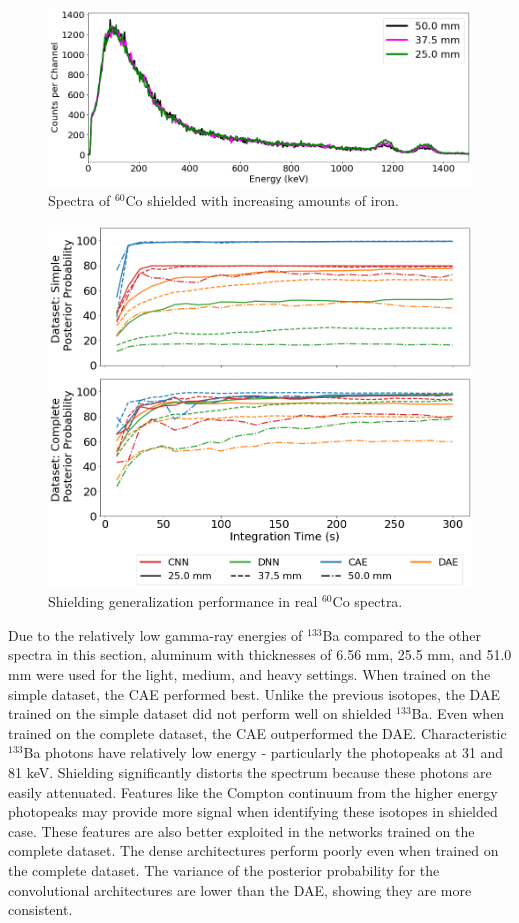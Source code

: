 \begin{figure}[H]
	\centering
	\includegraphics[width=1.0\linewidth]{images/shielded_co60}	\caption{Spectra of $^{60}$Co shielded with increasing amounts of iron.}
	\label{fig:shielded_co60}
\end{figure}

\begin{figure}[H]
	\centering
	\includegraphics[width=0.9\linewidth]{images/iron_co60}	\caption{Shielding generalization performance in real $^{60}$Co spectra.}
	\label{fig:iron_co60}
\end{figure}


Due to the relatively low gamma-ray energies of $^{133}$Ba compared to the other spectra in this section, aluminum with thicknesses of 6.56 mm, 25.5 mm, and 51.0 mm were used for the light, medium, and heavy settings. When trained on the simple dataset, the CAE performed best. Unlike the previous isotopes, the DAE trained on the simple dataset did not perform well on shielded $^{133}$Ba. Even when trained on the complete dataset, the CAE outperformed the DAE. Characteristic $^{133}$Ba photons have relatively low energy - particularly the photopeaks at 31 and 81 keV. Shielding significantly distorts the spectrum because these photons are easily attenuated. Features like the Compton continuum from the higher energy photopeaks may provide more signal when identifying these isotopes in shielded case. These features are also better exploited in the networks trained on the complete dataset. The dense architectures perform poorly even when trained on the complete dataset. The variance of the posterior probability for the convolutional architectures are lower than the DAE, showing they are more consistent.


